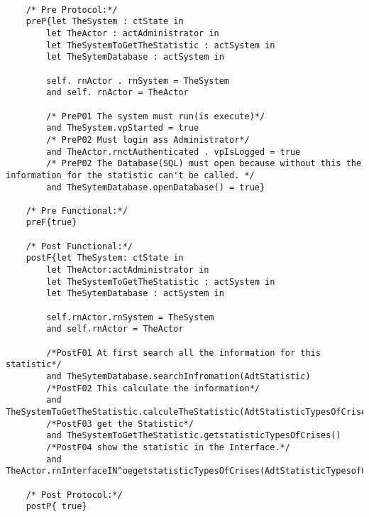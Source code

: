 	\scriptsize
	\vspace{0.5cm}
	\begin{lstlisting}[style=MessirStyle,firstnumber=auto,captionpos=b,caption={\msrmessir (MCL-oriented) specification of the operation \emph{oegetstatisticTypesOfCrises}.},label=OM-actAdministrator-oegetstatisticTypesOfCrises-MCL-LST]

	/* Pre Protocol:*/ 
	preP{let TheSystem : ctState in 
		let TheActor : actAdministrator in 
		let TheSystemToGetTheStatistic : actSystem in 
		let TheSytemDatabase : actSystem in 
		
		self. rnActor . rnSystem = TheSystem 
		and self. rnActor = TheActor
		
		/* PreP01 The system must run(is execute)*/
		and TheSystem.vpStarted = true
		/* PreP02 Must login ass Administrator*/
		and TheActor.rnctAuthenticated . vpIsLogged = true
		/* PreP02 The Database(SQL) must open because without this the information for the statistic can't be called. */
		and TheSytemDatabase.openDatabase() = true}
	
	/* Pre Functional:*/
	preF{true}
	
	/* Post Functional:*/ 
	postF{let TheSystem: ctState in
	    let TheActor:actAdministrator in
	    let TheSystemToGetTheStatistic : actSystem in
	    let TheSytemDatabase : actSystem in 
	    
		self.rnActor.rnSystem = TheSystem
	    and self.rnActor = TheActor
	    
	    /*PostF01 At first search all the information for this statistic*/
	    and TheSytemDatabase.searchInfromation(AdtStatistic)
	    /*PostF02 This calculate the information*/
	    and TheSystemToGetTheStatistic.calculeTheStatistic(AdtStatisticTypesOfCrises)
	    /*PostF03 get the Statistic*/
	    and TheSystemToGetTheStatistic.getstatisticTypesOfCrises()
	   	/*PostF04 show the statistic in the Interface.*/
	   	and TheActor.rnInterfaceIN^oegetstatisticTypesOfCrises(AdtStatisticTypesofCrises)}
	
	/* Post Protocol:*/ 
	postP{ true}
	
	\end{lstlisting}
	\normalsize 
	
	
	
	





